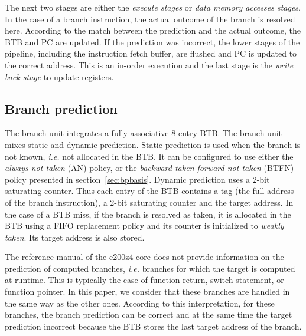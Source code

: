 The next two stages are either the \emph{execute stages} or \emph{data memory accesses stages}. 
In the case of a branch instruction, the actual outcome of the branch is resolved here.
According to the match between the prediction and the actual outcome, the BTB and PC are updated.
If the prediction was incorrect, the lower stages of the pipeline, including the instruction fetch buffer, are flushed and PC is updated to the correct address.
This is an in-order execution and the last stage is the \emph{write back stage} to update registers.
 

\subsection{Branch prediction}
\label{sec:architecture:dybrpred}


The branch unit integrates a fully associative 8-entry BTB. 
The branch unit mixes static and dynamic prediction. 
Static prediction is used when the branch is not known, \textsl{i.e.} not allocated in the BTB. 
It can be configured to use either the \emph{always not taken} (AN) policy, or the \emph{backward taken forward not taken} (BTFN) policy presented in section~\ref{sec:bpbasis}.
Dynamic prediction uses a 2-bit saturating counter.
Thus each entry of the BTB contains a tag (the full address of the branch instruction), a 2-bit saturating counter and the target address. 
In the case of a BTB miss, if the branch is resolved as taken, it is allocated in the BTB using a FIFO replacement policy and its counter is initialized to \emph{weakly taken}. 
Its target address is also stored.


The reference manual of the e200z4 core does not provide information on the prediction of computed branches, \textsl{i.e.} branches for which the target is computed at runtime.
This is typically the case of function return, switch statement, or function pointer.
In this paper, we consider that these branches are handled in the same way as the other ones.
According to this interpretation, for these branches, the branch prediction can be correct and at the same time the target prediction incorrect because the BTB stores the last target address of the branch.

